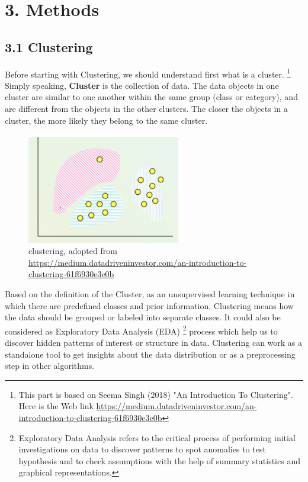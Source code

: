 \documentclass[nobib]{tufte-handout}
\begin{document}


\clearpage
\bigskip
\section{\textbf{3. Methods}}
\subsection{\textbf{3.1 Clustering}}


Before starting with Clustering, we should understand first what is a cluster. \footnote{This part is based on Seema Singh
 (2018) "An Introduction To Clustering". Here is the Web link \url{https://medium.datadriveninvestor.com/an-introduction-to-clustering-61f6930e3e0b}} Simply speaking,  \textbf{Cluster} is the collection of data. The data objects in one cluster are similar to one another within the same group (class or category),  and are different from the objects in the other clusters. 
The closer the objects in a cluster, the more likely they belong to the same cluster.

\begin{figure}
 \includegraphics[width=0.6\textwidth]{clustering.png}
  \caption{clustering, adopted from \url{https://medium.datadriveninvestor.com/an-introduction-to-clustering-61f6930e3e0b}}
\end{figure}

Based on the definition of the Cluster,  as an unsupervised learning technique in which there are predefined classes and prior information, Clustering means how the data should be grouped or labeled into separate classes. 
It could also be considered as Exploratory Data Analysis (EDA) \footnote{Exploratory Data Analysis refers to the critical process of performing initial investigations on data to discover patterns to spot anomalies to test hypothesis and to check assumptions with the help of summary statistics and graphical representations.} process which help us to discover hidden patterns of interest or structure in data. Clustering can work as a standalone tool to get insights about the data distribution or as a preprocessing step in other algorithms.
\end{document}
